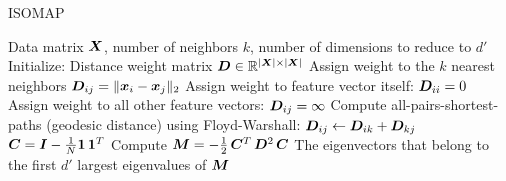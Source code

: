 \begin{algorithm}[H]
\caption{ISOMAP}
\begin{algorithmic}
  \REQUIRE Data matrix $\bm{X}$, number of neighbors $k$, number of dimensions to reduce to $d'$
  \STATE Initialize: Distance weight matrix $\bm{D}\in\mathbb{R}^{|\bm{X}|\times|\bm{X}|}$
  \STATE
    \STATE Assign weight to the $k$ nearest neighbors $\bm{D}_{ij}=\lVert \bm{x}_i-\bm{x}_j \rVert_2$
    \STATE Assign weight to feature vector itself: $\bm{D}_{ii}=0$
    \STATE Assign weight to all other feature vectors: $\bm{D}_{ij}=\infty$
  \ENDFOR
  \STATE
  \STATE Compute all-pairs-shortest-paths (geodesic distance) using Floyd-Warshall:
          \STATE $\bm{D}_{ij}\gets\bm{D}_{ik}+\bm{D}_{kj}$
        \ENDIF
      \ENDFOR
    \ENDFOR
  \ENDFOR
  \STATE
  \STATE $\bm{C}=\bm{I}-\frac1N\bm{1}\,\bm{1}^T$
  \STATE Compute $\bm{M}=-\frac12\,\bm{C}^T\,\bm{D}^2\,\bm{C}$
  \ENSURE The eigenvectors that belong to the first $d'$ largest eigenvalues of $\bm{M}$ 
\end{algorithmic}
\end{algorithm}
